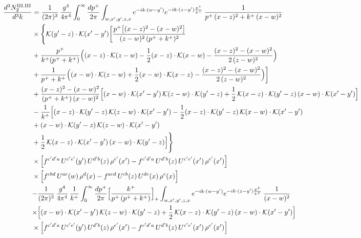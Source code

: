 \documentclass[9pt]{article}
\numberwithin{equation}{section}
\begin{document}
\begin{align}
\frac{d^{3}N^{\rm III.III}_{2}}{d^{3}k} & =\frac{1}{(2\pi)^{3}}\,\frac{g^{4}}{4\pi^{4}}\int_{0}^{\infty}\frac{dp^{+}}{2\pi}\int_{w,x',y',z,x}e^{-ik\cdot{(w-y')}}e^{-ik\cdot{(z-y')}\frac{p^{+}}{k^{+}}}\,\frac{1}{p^{+}\,(x-z)^{2}+k^{+}\,(x-w)^{2}}\notag\\
&\times\Bigg\{\mathcal{K}(y'-z)\cdot\mathcal{K}(x'-y')\bigg[\frac{p^{+}\big[(x-z)^{2}-(x-w)^{2}\big]}{(z-w)^{2}\,(p^{+}+k^{+})^{2}}\notag\\
&+\frac{p^{+}}{k^{+}(p^{+}+k^{+})}\Big((x-z)\cdot\mathcal{K}(z-w)-\frac{1}{2}(x-z)\cdot\mathcal{K}(x-w)-\frac{(x-z)^{2}-(x-w)^{2}}{2\,(z-w)^{2}}\Big)\notag\\
&+\frac{1}{p^{+}+k^{+}}\Big((x-w)\cdot\mathcal{K}(z-w)+\frac{1}{2}(x-w)\cdot\mathcal{K}(x-z)-\frac{(x-z)^{2}-(x-w)^{2}}{2\,(z-w)^{2}}\Big)\bigg]\notag\\
&+\frac{(x-z)^{2}-(x-w)^{2}}{(p^{+}+k^{+})\,(x-w)^{2}}\Big[(x-w)\cdot\mathcal{K}(x'-y')\,\mathcal{K}(z-w)\cdot\mathcal{K}(y'-z)+\frac{1}{2}\,\mathcal{K}(x-z)\cdot\mathcal{K}(y'-z)\,(x-w)\cdot\mathcal{K}(x'-y')\Big]\notag\\
&-\frac{1}{k^{+}}\Big[(x-z)\cdot\mathcal{K}(y'-z)\,\mathcal{K}(z-w)\cdot\mathcal{K}(x'-y')-\frac{1}{2}(x-z)\cdot\mathcal{K}(y'-z)\,\mathcal{K}(x-w)\cdot\mathcal{K}(x'-y')\notag\\
&+(x-w)\cdot\mathcal{K}(y'-z)\,\mathcal{K}(z-w)\cdot\mathcal{K}(x'-y')\notag\\
&+\frac{1}{2}\,\mathcal{K}(x-z)\cdot\mathcal{K}(x'-y')\,(x-w)\cdot\mathcal{K}(y'-z)\Big]\Bigg\}\notag\\
&\times\Big[f^{c'd'a}\,U^{c'e'}(y')\,U^{d'b}(z)\,\rho^{e'}(x')-f^{c'd'a}\,U^{d'b}(z)\,U^{c'e'}(x')\,\rho^{e'}(x')\Big]\notag\\
&\times\Big[f^{cbd}\,U^{ac}(w)\,\rho^{d}(x)-f^{acd}\,U^{cb}(z)\,U^{de}(x)\,\rho^{e}(x)\Big]\notag\\
&{-\frac{1}{(2\pi)^{3}}\,\frac{g^{4}}{4\pi^{4}}\,\frac{1}{k^{+}}\int_{0}^{\infty}\frac{dp^{+}}{2\pi}\Big[\frac{k^{+}}{p^{+}\,(p^{+}+k^{+})}\Big]_{+}\int_{w,x',y',z,x}e^{-ik\cdot{(w-y')}}e^{-ik\cdot{(z-y')}\frac{p^{+}}{k^{+}}}\,\frac{1}{(x-w)^{2}}}\notag\\
&{\times\Big[(x-w)\cdot\mathcal{K}(x'-y')\,\mathcal{K}(z-w)\cdot\mathcal{K}(y'-z)+\frac{1}{2}\,\mathcal{K}(x-z)\cdot\mathcal{K}(y'-z)\,(x-w)\cdot\mathcal{K}(x'-y')\Big]}\notag\\
&\times\Big[f^{c'd'a}\,U^{c'e'}(y')\,U^{d'b}(z)\,\rho^{e'}(x')-f^{c'd'a}\,U^{d'b}(z)\,U^{c'e'}(x')\,\rho^{e'}(x')\Big]\notag\\

\end{align}
\end{document}

